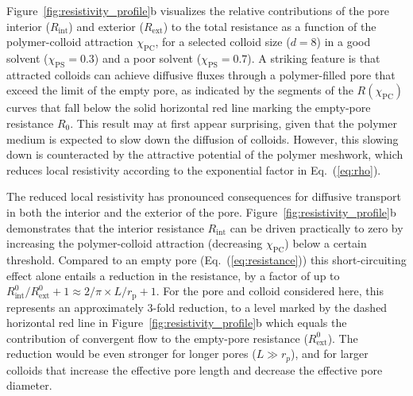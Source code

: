 \documentclass[12pt, a4paper]{article}
\begin{document}
Figure~\ref{fig:resistivity_profile}b visualizes the relative contributions of the pore interior ($R_{\text{int}}$) and exterior ($R_{\text{ext}}$) to the total resistance as a function of the polymer-colloid attraction $\chi_\text{PC}$,
for a selected colloid size ($d = 8$) in a good solvent ($\chi_\text{PS} = 0.3$) and a poor solvent ($\chi_\text{PS} = 0.7$).
A striking feature is that attracted colloids can achieve diffusive fluxes through a polymer-filled pore that exceed the limit of the empty pore, as indicated by the segments of the $R(\chi_{\text{PC}})$ curves that fall below the solid horizontal red line marking the empty-pore resistance $R_{0}$.
This result may at first appear surprising, given that the polymer medium is expected to slow down the diffusion of colloids.
However, this slowing down is counteracted by the attractive potential of the polymer meshwork, which reduces local resistivity according to the exponential factor in Eq.~(\ref{eq:rho}).

The reduced local resistivity has pronounced consequences for diffusive transport in both the interior and the exterior of the pore.
Figure~\ref{fig:resistivity_profile}b demonstrates that the interior resistance $R_{\text{int}}$ can be driven practically to zero by increasing the polymer-colloid attraction (decreasing $\chi_\text{PC}$) below a certain threshold.
Compared to an empty pore (Eq.~(\ref{eq:resistance})) this short-circuiting effect alone entails a reduction in the resistance, by a factor of up to $R^0_{\text{int}}/R^0_{\text{ext}}+1 \approx 2/\pi \times L / r_{\text{p}} + 1$.
For the pore and colloid considered here, this represents an approximately 3-fold reduction, to a level marked by the dashed horizontal red line in Figure~\ref{fig:resistivity_profile}b which equals the contribution of convergent flow to the empty-pore resistance ($R^0_\text{ext}$).
The reduction would be even stronger for longer pores ($L\gg r_p$), and for larger colloids that increase the effective pore length and decrease the effective pore diameter.
\end{document}
